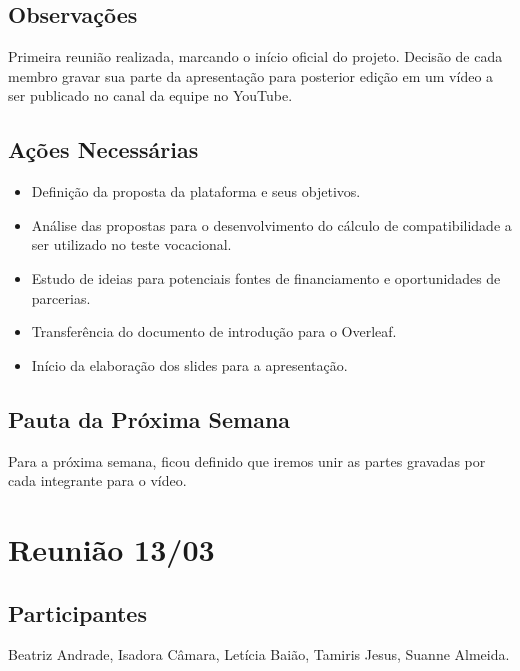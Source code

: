 \begin{apendicesenv}
\subsection*{Observações}
Primeira reunião realizada, marcando o início oficial do projeto. 
Decisão de cada membro gravar sua parte da apresentação para posterior edição em um vídeo a ser publicado no canal da equipe no YouTube. 

\subsection*{Ações Necessárias}
\begin{itemize}
    \item Definição da proposta da plataforma e seus objetivos.
    \item Análise das propostas para o desenvolvimento do cálculo de compatibilidade a ser utilizado no teste vocacional.
    \item Estudo de ideias para potenciais fontes de financiamento e oportunidades de parcerias.
    \item Transferência do documento de introdução para o Overleaf.
    \item Início da elaboração dos slides para a apresentação.
\end{itemize}

\subsection*{Pauta da Próxima Semana}
Para a próxima semana, ficou definido que iremos unir as partes gravadas por cada integrante para o vídeo.

\section*{Reunião 13/03}

\subsection*{Participantes}
Beatriz Andrade, Isadora Câmara, Letícia Baião, Tamiris Jesus, Suanne Almeida.


\end{apendicesenv}
